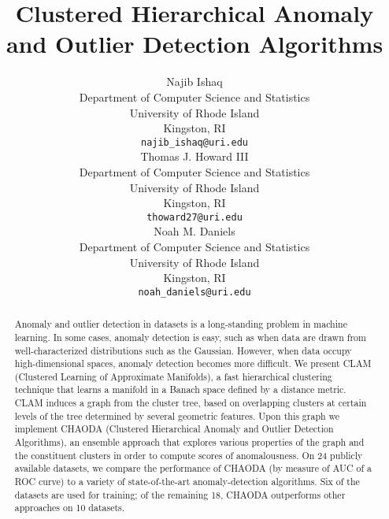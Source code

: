 \documentclass{article}
\title{Clustered Hierarchical Anomaly and Outlier Detection Algorithms}
\author{
  Najib Ishaq \\
  Department of Computer Science and Statistics\\
  University of Rhode Island\\
  Kingston, RI\\
  \texttt{najib\_ishaq@uri.edu} \\
   \And
 Thomas J. Howard III \\
  Department of Computer Science and Statistics\\
  University of Rhode Island\\
  Kingston, RI\\
  \texttt{thoward27@uri.edu} \\
  \AND
  Noah M. Daniels \\
  Department of Computer Science and Statistics\\
  University of Rhode Island\\
  Kingston, RI\\
  \texttt{noah\_daniels@uri.edu} \\
}
\begin{document}
    \maketitle

    \begin{abstract}
        Anomaly and outlier detection in datasets is a long-standing problem in machine learning.
In some cases, anomaly detection is easy, such as when data are drawn from well-characterized distributions such as the Gaussian.
However, when data occupy high-dimensional spaces, anomaly detection becomes more difficult.
We present CLAM (Clustered Learning of Approximate Manifolds), a fast hierarchical clustering technique that learns a manifold in a Banach space defined by a distance metric.
CLAM induces a graph from the cluster tree, based on overlapping clusters at certain levels of the tree determined by several geometric features.
Upon this graph we implement CHAODA (Clustered Hierarchical Anomaly and Outlier Detection Algorithms), an ensemble approach that explores various properties of the graph and the constituent clusters in order to compute scores of anomalousness.
On 24 publicly available datasets, we compare the performance of CHAODA (by measure of AUC of a ROC curve) to a variety of state-of-the-art anomaly-detection algorithms. Six of the datasets are used for training; of the remaining 18, 
CHAODA outperforms other approaches on 10 datasets.
    \end{abstract}

    
    
    
    
    

    
    
\end{document}
